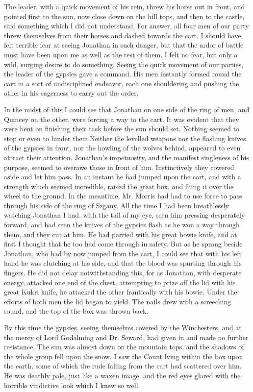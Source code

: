 The leader, with a quick movement of his rein, threw his horse out in front, and pointed first to the sun, now close down on the hill tops, and then to the castle, said something which I did not understand. For answer, all four men of our party threw themselves from their horses and dashed towards the cart. I should have felt terrible fear at seeing Jonathan in such danger, but that the ardor of battle must have been upon me as well as the rest of them. I felt no fear, but only a wild, surging desire to do something. Seeing the quick movement of our parties, the leader of the gypsies gave a command. His men instantly formed round the cart in a sort of undisciplined endeavor, each one shouldering and pushing the other in his eagerness to carry out the order. 

In the midst of this I could see that Jonathan on one side of the ring of men, and Quincey on the other, were forcing a way to the cart. It was evident that they were bent on finishing their task before the sun should set. Nothing seemed to stop or even to hinder them.Neither the levelled weapons nor the flashing knives of the gypsies in front, nor the howling of the wolves behind, appeared to even attract their attention. Jonathan's impetuosity, and the manifest singleness of his purpose, seemed to overawe those in front of him. Instinctively they cowered aside and let him pass. In an instant he had jumped upon the cart, and with a strength which seemed incredible, raised the great box, and flung it over the wheel to the ground. In the meantime, Mr. Morris had had to use force to pass through his side of the ring of Szgany. All the time I had been breathlessly watching Jonathan I had, with the tail of my eye, seen him pressing desperately forward, and had seen the knives of the gypsies flash as he won a way through them, and they cut at him. He had parried with his great bowie knife, and at first I thought that he too had come through in safety. But as he sprang beside Jonathan, who had by now jumped from the cart, I could see that with his left hand he was clutching at his side, and that the blood was spurting through his fingers. He did not delay notwithstanding this, for as Jonathan, with desperate energy, attacked one end of the chest, attempting to prize off the lid with his great Kukri knife, he attacked the other frantically with his bowie. Under the efforts of both men the lid began to yield. The nails drew with a screeching sound, and the top of the box was thrown back. 

By this time the gypsies, seeing themselves covered by the Winchesters, and at the mercy of Lord Godalming and Dr. Seward, had given in and made no further resistance. The sun was almost down on the mountain tops, and the shadows of the whole group fell upon the snow. I saw the Count lying within the box upon the earth, some of which the rude falling from the cart had scattered over him. He was deathly pale, just like a waxen image, and the red eyes glared with the horrible vindictive look which I knew so well. 

